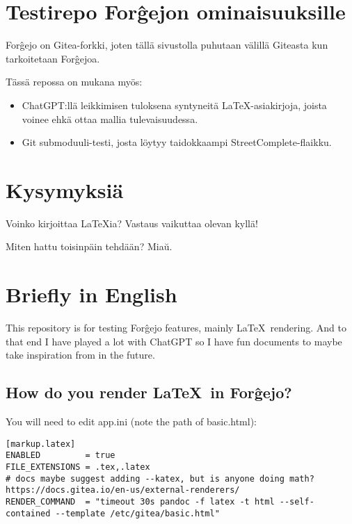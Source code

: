 \documentclass[a4paper,colorlinks,linkcolor=blue]{artikel3}
\begin{document}
\hypersetup{urlcolor=blue}

\section*{Testirepo For\^gejon ominaisuuksille}

For\^gejo on Gitea-forkki, joten tällä sivustolla puhutaan välillä Giteasta kun tarkoitetaan For\^gejoa.

Tässä repossa on mukana myös:


\begin{itemize}
    \item ChatGPT:llä leikkimisen tuloksena syntyneitä \LaTeX -asiakirjoja, joista voinee ehkä ottaa mallia tulevaisuudessa.
    \item Git submoduuli-testi, josta löytyy taidokkaampi StreetComplete-flaikku.
\end{itemize}

\section*{Kysymyksiä}
Voinko kirjoittaa \LaTeX ia?
Vastaus vaikuttaa olevan kyllä!

Miten hattu toisinpäin tehdään?
Mia\u{u}.


\section*{Briefly in English}

This repository is for testing For\^gejo features, mainly \LaTeX\ rendering.
And to that end I have played a lot with ChatGPT so I have fun documents to maybe take inspiration from in the future.

\subsection*{How do you render \LaTeX\ in For\^gejo?}

You will need to edit app.ini (note the path of basic.html):

\begin{verbatim}
[markup.latex]
ENABLED         = true
FILE_EXTENSIONS = .tex,.latex
# docs maybe suggest adding --katex, but is anyone doing math? https://docs.gitea.io/en-us/external-renderers/
RENDER_COMMAND  = "timeout 30s pandoc -f latex -t html --self-contained --template /etc/gitea/basic.html"
\end{verbatim}
\end{document}
